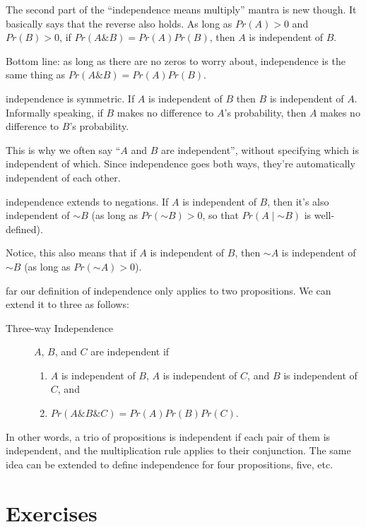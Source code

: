 \documentclass[justified]{tufte-book}
\providecommand{\tightlist}{%
  \setlength{\itemsep}{0pt}\setlength{\parskip}{0pt}}
\newcommand{\given}{\mid}
\renewcommand{\neg}{\mathbin{\sim}}
\renewcommand{\wedge}{\mathbin{\&}}
\newcommand{\p}{Pr}
\theoremstyle{definition}
\theoremstyle{definition}
\theoremstyle{definition}
\theoremstyle{remark}
\begin{document}
The second part of the ``independence means multiply'' mantra is new
though. It basically says that the reverse also holds. As long as
\(\p(A) > 0\) and \(\p(B) > 0\), if \(\p(A \wedge B) = \p(A)\p(B)\),
then \(A\) is independent of \(B\).

Bottom line: as long as there are no zeros to worry about, independence
is the same thing as \(\p(A \wedge B) = \p(A)\p(B)\).

 independence is symmetric. If \(A\) is independent
of \(B\) then \(B\) is independent of \(A\). Informally speaking, if
\(B\) makes no difference to \(A\)'s probability, then \(A\) makes no
difference to \(B\)'s probability.

This is why we often say ``\(A\) and \(B\) are independent'', without
specifying which is independent of which. Since independence goes both
ways, they're automatically independent of each other.

 independence extends to negations. If \(A\) is
independent of \(B\), then it's also independent of \(\neg B\) (as long
as \(\p(\neg B) > 0\), so that \(\p(A \given \neg B)\) is well-defined).

Notice, this also means that if \(A\) is independent of \(B\), then
\(\neg A\) is independent of \(\neg B\) (as long as \(\p(\neg A) > 0\)).

 far our definition of independence only applies to two
propositions. We can extend it to three as follows:

\begin{description}
\item[Three-way Independence]
\(A\), \(B\), and \(C\) are independent if

\begin{enumerate}
\def\labelenumi{\roman{enumi}.}
\tightlist
\item
  \(A\) is independent of \(B\), \(A\) is independent of \(C\), and
  \(B\) is independent of \(C\), and
\item
  \(\p(A \wedge B \wedge C) = \p(A)\p(B)\p(C)\).
\end{enumerate}
\end{description}

In other words, a trio of propositions is independent if each pair of
them is independent, and the multiplication rule applies to their
conjunction. The same idea can be extended to define independence for
four propositions, five, etc.

\hypertarget{ch6ex}{%
\section*{Exercises}\label{ch6ex}}
\end{document}
